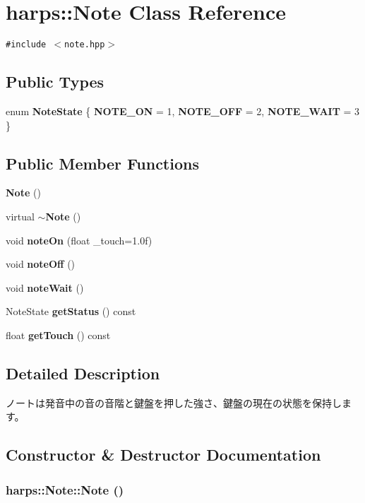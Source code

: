 \section{harps::Note Class Reference}
\label{classharps_1_1Note}
{\tt \#include $<$note.hpp$>$}

\subsection*{Public Types}
\begin{CompactItemize}
\item 
enum \textbf{NoteState} \{ \textbf{NOTE\_\-ON} =  1, 
\textbf{NOTE\_\-OFF} =  2, 
\textbf{NOTE\_\-WAIT} =  3
 \}
\end{CompactItemize}
\subsection*{Public Member Functions}
\begin{CompactItemize}
\item 
{\bf Note} ()
\item 
virtual {\bf $\sim$Note} ()
\item 
void {\bf noteOn} (float \_\-touch=1.0f)
\item 
void {\bf noteOff} ()
\item 
void {\bf noteWait} ()
\item 
NoteState {\bf getStatus} () const 
\item 
float {\bf getTouch} () const 
\end{CompactItemize}


\subsection{Detailed Description}
ノートは発音中の音の音階と鍵盤を押した強さ、鍵盤の現在の状態を保持します。 

\subsection{Constructor \& Destructor Documentation}
\subsubsection[Note]{\setlength{\rightskip}{0pt plus 5cm}harps::Note::Note ()\hspace{0.3cm}{\tt  [inline]}}\label{classharps_1_1Note_e30d3c03bff9e694ce939e0e5c62212b}


